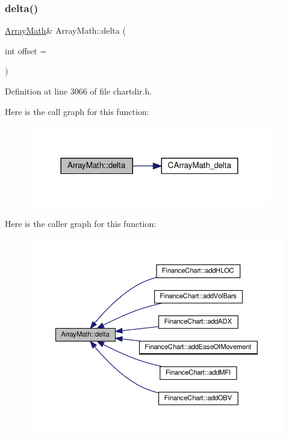 \subsubsection{\texorpdfstring{delta()}{delta()}}
{\footnotesize\ttfamily \hyperlink{class_array_math}{Array\+Math}\& Array\+Math\+::delta (\begin{DoxyParamCaption}\item[{int}]{offset = {} }\end{DoxyParamCaption})\hspace{0.3cm}{\ttfamily [inline]}}



Definition at line 3066 of file chartdir.\+h.

Here is the call graph for this function\+:
\nopagebreak
\begin{figure}[H]
\begin{center}
\leavevmode
\includegraphics[width=300pt]{class_array_math_a63280677d4282215230467eadb0ff3ca_cgraph}
\end{center}
\end{figure}
Here is the caller graph for this function\+:
\nopagebreak
\begin{figure}[H]
\begin{center}
\leavevmode
\includegraphics[width=350pt]{class_array_math_a63280677d4282215230467eadb0ff3ca_icgraph}
\end{center}
\end{figure}
\mbox{\label{class_array_math_a5c0ea92917740188c95e4e410eef2661}} 

